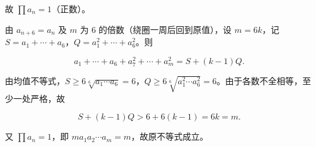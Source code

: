 \begin{answer}
故 $\prod a_n=1$（正数）。

由 $a_{n+6}=a_n$ 及 $m$ 为 $6$ 的倍数（绕圈一周后回到原值），设 $m=6k$，记 $S=a_1+\cdots+a_6$，$Q=a_1^2+\cdots+a_6^2$。则

\nopagebreak[4]
\[a_1+\cdots+a_6+a_7^2+\cdots+a_m^2=S+(k-1)Q.\]

由均值不等式，$S\geqslant6\sqrt[6]{a_1\cdots a_6}=6$，$Q\geqslant6\sqrt[6]{a_1^2\cdots a_6^2}=6$。由于各数不全相等，至少一处严格，故

\nopagebreak[4]
\[S+(k-1)Q>6+6(k-1)=6k=m.\]

又 $\prod a_n=1$，即 $m a_1a_2\cdots a_m=m$，故原不等式成立。


\end{answer}